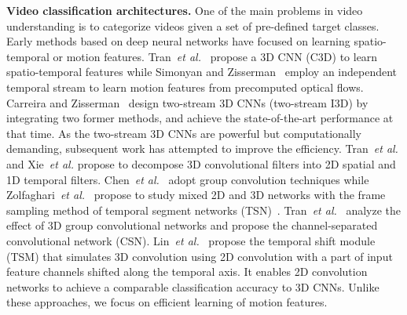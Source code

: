 \documentclass[runningheads]{llncs}
\begin{document}
\noindent
\textbf{Video classification architectures.}
One of the main problems in video understanding is to categorize videos given a set of pre-defined target classes.
Early methods based on deep neural networks have focused on learning spatio-temporal or motion features. Tran~\emph{et al.}~\cite{tran2015learning} propose a 3D CNN (C3D) to learn spatio-temporal features while Simonyan and Zisserman~\cite{simonyan2014two} employ an independent temporal stream to learn motion features from precomputed optical flows.
Carreira and Zisserman~\cite{carreira2017quo} design two-stream 3D CNNs (two-stream I3D) by integrating two former methods, and achieve the state-of-the-art performance at that time.
As the two-stream 3D CNNs are powerful but computationally demanding, subsequent work has attempted to improve the efficiency.
Tran~\emph{et al.}\cite{tran2018closer} and  Xie~\emph{et al.}\cite{xie2018rethinking} propose to decompose 3D convolutional filters into 2D spatial and 1D temporal filters.
Chen~\emph{et al.}~\cite{chen2018multi} adopt group convolution techniques while Zolfaghari~\emph{et al.}~\cite{zolfaghari2018eco} propose to study mixed 2D and 3D networks with the frame sampling method of temporal segment networks (TSN)~\cite{wang2016temporal}.
Tran~\emph{et al.}~\cite{tran2019video} analyze the effect of 3D group convolutional networks and propose the channel-separated convolutional network (CSN).
Lin~\emph{et al.}~\cite{lin2019tsm} propose the temporal shift module (TSM) that simulates 3D convolution using 2D convolution with a part of input feature channels shifted along the temporal axis. It enables 2D convolution networks to achieve a comparable classification accuracy to 3D CNNs. Unlike these approaches, we focus on efficient learning of motion features. 
\end{document}
